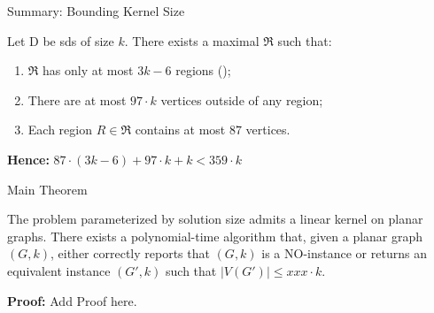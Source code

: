 \begin{frame}[c]{Summary: Bounding Kernel Size}

    Let D be sds of size $k$. There exists a maximal \dreg $\mathfrak{R}$ such that:

    \begin{enumerate}
        \item $\mathfrak{R}$ has only at most $3 k - 6$ regions (\cite{Alber2004});
        \item There are at most $97 \cdot k$ vertices outside of any region;
        \item Each region  $R \in \mathfrak{R}$ contains at most $87$ vertices.
    \end{enumerate}

    \textbf{Hence: } $87 \cdot (3k - 6) + 97 \cdot k + k < 359 \cdot k$

\end{frame}

\begin{frame}[c]{Main Theorem}
\begin{tcolorbox}[colback=TUMBlueLighter,title=The Main Theorem]
    The \sdom problem parameterized by solution size admits a linear kernel on planar graphs.
    There exists a polynomial-time algorithm that, given a planar graph $(G, k)$, either correctly reports that $(G, k)$ is a NO-instance or returns an equivalent instance $(G', k)$ such that $|V(G')| \leq xxx \cdot k$.
\end{tcolorbox}
\textbf{Proof: } Add Proof here.
\end{frame}

